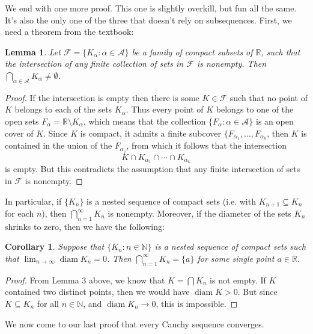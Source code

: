 \documentclass[12pt,letterpaper]{article}
\newtheorem{lemma}{Lemma}
\newtheorem{cor}{Corollary}
\newcommand{\R}{\mathbb{R}}
\newcommand{\N}{\mathbb{N}}
\DeclareMathOperator{\diam}{diam}
\begin{document}
We end with one more proof. This one is slightly overkill, but fun all the same. It's also the only one of the three that doesn't rely on subsequences. First, we need a theorem from the textbook:
\begin{lemma}
 Let $\mathcal{F}=\{K_\alpha : \alpha\in\mathcal{A}\}$ be a family of compact subsets of $\R$, such that the intersection of any finite collection of sets in $\mathcal{F}$ is nonempty. Then $\bigcap_{\alpha\in\mathcal{A}}K_\alpha \neq\emptyset$.
\end{lemma}
\begin{proof}
If the intersection is empty then there is some $K\in\mathcal{F}$ such that no point of $K$ belongs to each of the sets $K_\alpha$. Thus every point of $K$ belongs to one of the open sets $F_\alpha = \R\setminus K_\alpha$, which means that the collection $\{F_\alpha:\alpha\in\mathcal{A}\}$ is an open cover of $K$. Since $K$ is compact, it admits a finite subcover $\{F_{\alpha_1},\ldots, F_{\alpha_k}$, then $K$ is contained in the union of the $F_{\alpha_j}$, from which it follows that the intersection
\[
 K\cap K_{\alpha_1}\cap\cdots \cap K_{\alpha_k}
\]
is empty. But this contradicts the assumption that any finite intersection of sets in $\mathcal{F}$ is nonempty.
\end{proof}
In particular, if $\{K_n\}$ is a nested sequence of compact sets (i.e. with $K_{n+1}\subseteq K_n$ for each $n$), then $\bigcap_{n=1}^\infty K_n$ is nonempty. Moreover, if the diameter of the sets $K_n$ shrinks to zero, then we have the following:
\begin{cor}
 Suppose that $\{K_n:n\in\N\}$ is a nested sequence of compact sets such that $\lim_{n\to \infty}\diam K_n = 0$. Then $\bigcap_{n=1}^\infty K_n = \{a\}$ for some single point $a\in\R$.
\end{cor}
\begin{proof}
From Lemma 3 above, we know that $K=\bigcap K_n$ is not empty. If $K$ contained two distinct points, then we would have $\diam K>0$. But since $K\subseteq K_n$ for all $n\in\N$, and $\diam K_n\to 0$, this is impossible.
\end{proof}
We now come to our last proof that every Cauchy sequence converges.
\end{document}
